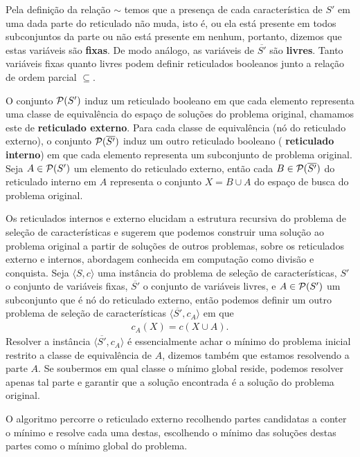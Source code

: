 Pela definição da relação $\sim$ temos que a presença de cada 
característica de $S'$ em uma dada parte do reticulado não muda, isto é,
ou ela está presente em todos subconjuntos da parte ou não está presente
em nenhum, portanto, dizemos que estas variáveis são {\bf fixas}. De 
modo análogo, as variáveis de $\overline{S'}$ são {\bf livres}. Tanto 
variáveis fixas quanto livres podem definir reticulados booleanos junto 
a relação de ordem parcial $\subseteq$.

O conjunto $\mathcal{P} (S')$ induz um reticulado booleano em que cada
elemento representa uma classe de equivalência do espaço de soluções
do problema original, chamamos este de {\bf reticulado externo}. Para 
cada classe de equivalência (nó do reticulado externo), o conjunto 
$\mathcal{P} (\overline {S'})$ induz um outro reticulado booleano ({\bf
reticulado interno}) em que cada elemento representa um subconjunto de
problema original. Seja $A \in \mathcal{P} (S')$ um elemento do reticulado 
externo, então cada $B \in \mathcal{P} (\overline{S'})$ do reticulado 
interno em $A$ representa o conjunto $X = B \cup A$ do espaço de busca
do problema original.

Os reticulados internos e externo elucidam a estrutura recursiva do 
problema de seleção de características e sugerem que podemos construir 
uma solução ao problema original a partir de soluções de outros 
problemas, sobre os reticulados externo e internos, abordagem conhecida
em computação como divisão e conquista. Seja $\langle S, c \rangle$ uma 
instância do problema de seleção de características, $S'$ o conjunto de 
variáveis fixas, $\overline{S'}$ o conjunto de variáveis livres, e 
$A \in \mathcal{P} (S')$ um subconjunto que é nó do reticulado externo, 
então podemos definir um outro problema de seleção de características 
$\langle \overline{S'}, c_{A} \rangle$ em que 
\begin{align*}
    c_{A} (X) = c (X \cup A).
\end{align*}
Resolver a instância $\langle \overline{S'}, c_{A} \rangle$ é 
essencialmente achar o mínimo do problema inicial restrito a classe de
equivalência de $A$, dizemos também que estamos resolvendo a parte $A$. 
Se soubermos em qual classe o mínimo global reside, podemos resolver 
apenas tal parte e garantir que a solução encontrada é a solução do 
problema original.

O algoritmo  percorre o reticulado externo recolhendo 
partes candidatas a conter o mínimo e resolve cada uma destas, 
escolhendo o mínimo das soluções destas partes como o mínimo global do 
problema.

